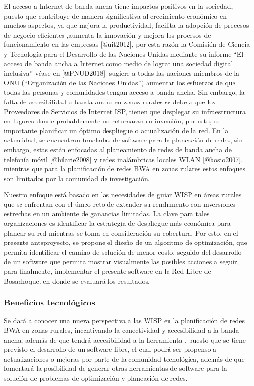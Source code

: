 \documentclass[]{article}
\begin{document}
El acceso a Internet de banda ancha tiene impactos positivos en la
sociedad, puesto que contribuye de manera significativa al crecimiento
económico en muchos aspectos, ya que mejora la productividad, facilita
la adopción de procesos de negocio eficientes ,aumenta la innovación y
mejora los procesos de funcionamiento en las empresas {[}@uit2012{]},
por esta razón la Comisión de Ciencia y Tecnología para el Desarrollo de
las Naciones Unidas mediante su informe ``El acceso de banda ancha a
Internet como medio de lograr una sociedad digital inclusiva'' véase en
{[}@PNUD2018{]}, sugiere a todas las naciones miembros de la ONU
(``Organización de las Naciones Unidas'') aumentar los esfuerzos de que
todas las personas y comunidades tengan acceso a banda ancha. Sin
embargo, la falta de accesibilidad a banda ancha en zonas rurales se
debe a que los Proveedores de Servicios de Internet ISP, tienen que
desplegar su infraestructura en lugares donde probablemente no
retornaran su inversión, por esto, es importante planificar un óptimo
despliegue o actualización de la red. En la actualidad, se encuentran
toneladas de software para la planeación de redes, sin embargo, estas
están enfocadas al planeamiento de redes de banda ancha de telefonía
móvil {[}@hilarie2008{]} y redes inalámbricas locales WLAN
{[}@bosio2007{]}, mientras que para la planificación de redes BWA en
zonas rulares estos enfoques son limitados por la comunidad de
investigación.

Nuestro enfoque está basado en las necesidades de guiar WISP en áreas
rurales que se enfrentan con el único reto de extender su rendimiento
con inversiones estrechas en un ambiente de ganancias limitadas. La
clave para tales organizaciones es identificar la estrategia de
despliegue más económica para planear su red mientras se toma en
consideración su cobertura. Por esto, en el presente anteproyecto, se
propone el diseño de un algoritmo de optimización, que permita
identificar el camino de solución de menor costo, seguido del desarrollo
de un software que permita mostrar visualmente las posibles acciones a
seguir, para finalmente, implementar el presente software en la Red
Libre de Bosachoque, en donde se evaluará los resultados.

\subsubsection{Beneficios
tecnológicos}\label{beneficios-tecnoluxf3gicos}

Se dará a conocer una nueva perspectiva a las WISP en la planificación
de redes BWA en zonas rurales, incentivando la conectividad y
accesibilidad a la banda ancha, además de que tendrá accesibilidad a la
herramienta , puesto que se tiene previsto el desarrollo de un software
libre, el cual podrá ser propenso a actualizaciones o mejoras por parte
de la comunidad tecnológica, además de que fomentará la posibilidad de
generar otras herramientas de software para la solución de problemas de
optimización y planeación de redes.
\end{document}
